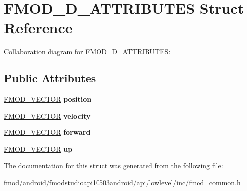 \hypertarget{struct_f_m_o_d__3_d___a_t_t_r_i_b_u_t_e_s}{\section{F\+M\+O\+D\+\_\+D\+\_\+\+A\+T\+T\+R\+I\+B\+U\+T\+E\+S Struct Reference}
\label{struct_f_m_o_d__3_d___a_t_t_r_i_b_u_t_e_s}
}


Collaboration diagram for F\+M\+O\+D\+\_\+D\+\_\+\+A\+T\+T\+R\+I\+B\+U\+T\+E\+S\+:
\subsection*{Public Attributes}
\begin{DoxyCompactItemize}
\item 
\hypertarget{struct_f_m_o_d__3_d___a_t_t_r_i_b_u_t_e_s_a66d34f6da546c09f55077b454987ac48}{\hyperlink{struct_f_m_o_d___v_e_c_t_o_r}{F\+M\+O\+D\+\_\+\+V\+E\+C\+T\+O\+R} {\bfseries position}}\label{struct_f_m_o_d__3_d___a_t_t_r_i_b_u_t_e_s_a66d34f6da546c09f55077b454987ac48}

\item 
\hypertarget{struct_f_m_o_d__3_d___a_t_t_r_i_b_u_t_e_s_a1590142763b7d82eca72bf3d559bd28f}{\hyperlink{struct_f_m_o_d___v_e_c_t_o_r}{F\+M\+O\+D\+\_\+\+V\+E\+C\+T\+O\+R} {\bfseries velocity}}\label{struct_f_m_o_d__3_d___a_t_t_r_i_b_u_t_e_s_a1590142763b7d82eca72bf3d559bd28f}

\item 
\hypertarget{struct_f_m_o_d__3_d___a_t_t_r_i_b_u_t_e_s_a7e9c254f5d13e496d678826c262eac7d}{\hyperlink{struct_f_m_o_d___v_e_c_t_o_r}{F\+M\+O\+D\+\_\+\+V\+E\+C\+T\+O\+R} {\bfseries forward}}\label{struct_f_m_o_d__3_d___a_t_t_r_i_b_u_t_e_s_a7e9c254f5d13e496d678826c262eac7d}

\item 
\hypertarget{struct_f_m_o_d__3_d___a_t_t_r_i_b_u_t_e_s_aaac3d8ed834651afa60b4bcb84b2c7d1}{\hyperlink{struct_f_m_o_d___v_e_c_t_o_r}{F\+M\+O\+D\+\_\+\+V\+E\+C\+T\+O\+R} {\bfseries up}}\label{struct_f_m_o_d__3_d___a_t_t_r_i_b_u_t_e_s_aaac3d8ed834651afa60b4bcb84b2c7d1}

\end{DoxyCompactItemize}


The documentation for this struct was generated from the following file\+:\begin{DoxyCompactItemize}
\item 
fmod/android/fmodstudioapi10503android/api/lowlevel/inc/fmod\+\_\+common.\+h\end{DoxyCompactItemize}
